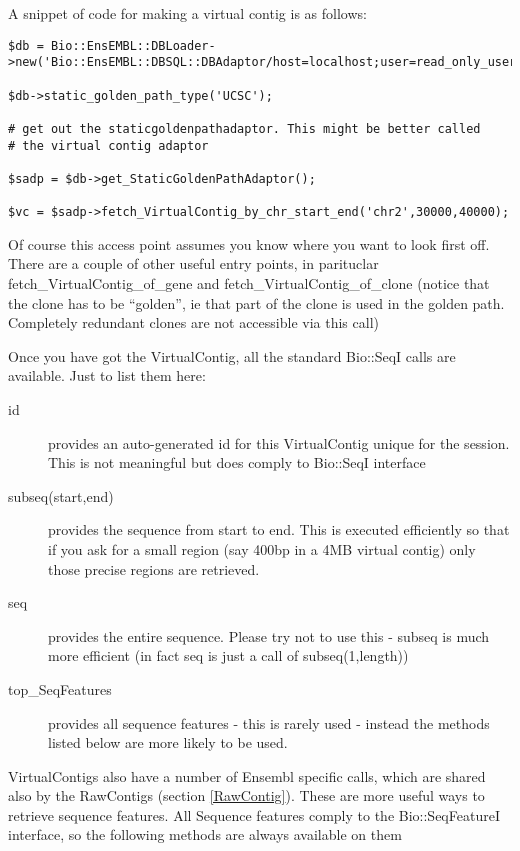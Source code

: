 \documentclass[11pt,a4paper]{article}
\begin{document}
A snippet of code for making a virtual contig is as follows:

\begin{verbatim}
$db = Bio::EnsEMBL::DBLoader->new('Bio::EnsEMBL::DBSQL::DBAdaptor/host=localhost;user=read_only_user;dbname=test_ensembl');

$db->static_golden_path_type('UCSC');

# get out the staticgoldenpathadaptor. This might be better called
# the virtual contig adaptor

$sadp = $db->get_StaticGoldenPathAdaptor();

$vc = $sadp->fetch_VirtualContig_by_chr_start_end('chr2',30000,40000);
\end{verbatim}

Of course this access point assumes you know where you want to look
first off. There are a couple of other useful entry points, in
parituclar fetch\_VirtualContig\_of\_gene and
fetch\_VirtualContig\_of\_clone (notice that the clone has to be
``golden'', ie that part of the clone is used in the golden
path. Completely redundant clones are not accessible via this call)


Once you have got the VirtualContig, all the standard Bio::SeqI calls are available.
Just to list them here:

\begin{description}
\item[id] provides an auto-generated id for this VirtualContig unique
for the session. This is not meaningful but does comply to Bio::SeqI interface
\item[subseq(start,end)] provides the sequence from start to end. This is executed
efficiently so that if you ask for a small region (say 400bp in a 4MB virtual contig)
only those precise regions are retrieved.
\item[seq] provides the entire sequence. Please try not to use this - subseq is much more
efficient (in fact seq is just a call of subseq(1,length))
\item[top\_SeqFeatures] provides all sequence features - this is rarely used - instead the
methods listed below are more likely to be used.
\end{description}

VirtualContigs also have a number of Ensembl specific calls, which are
shared also by the RawContigs (section \ref{RawContig}). These are
more useful ways to retrieve sequence features. All Sequence features
comply to the Bio::SeqFeatureI interface, so the following methods are
always available on them
\end{document}
